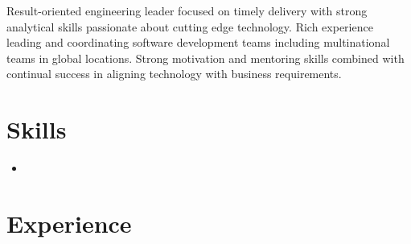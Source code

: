 \documentclass[11pt,a4paper,roman]{moderncv}       %
\begin{document}
\makecvtitle

\small{Result-oriented engineering leader focused on timely delivery with strong analytical skills passionate about cutting edge technology. Rich experience leading and coordinating software development teams including multinational teams in global locations. Strong motivation and mentoring skills combined with continual success in aligning technology with business requirements.}

\section{Skills}

\begin{itemize}
    \item 
\end{itemize}

\section{Experience}

\end{document}

